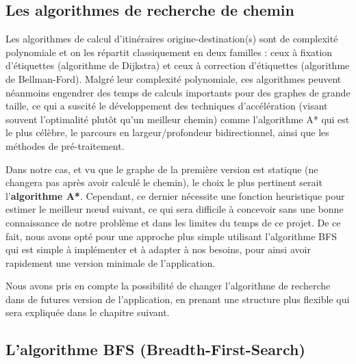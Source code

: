 \subsection{Les algorithmes de recherche de chemin}
Les algorithmes de calcul d'itinéraires origine-destination(s) sont de complexité polynomiale et on les répartit classiquement en deux familles : ceux à fixation d'étiquettes (algorithme de Dijkstra) et ceux à correction d'étiquettes (algorithme de Bellman-Ford).
Malgré leur complexité polynomiale, ces algorithmes peuvent néanmoins engendrer des temps de calculs importants pour des graphes de grande taille, ce qui a suscité le développement des techniques d'accélération (visant souvent l'optimalité plutôt qu'un meilleur chemin) comme l'algorithme A* qui est le plus célèbre, le parcours en largeur/profondeur bidirectionnel, ainsi que les méthodes de pré-traitement.
\newline

Dans notre cas, et vu que le graphe de la première version est statique (ne changera pas après avoir calculé le chemin), le choix le plus pertinent serait l'\textbf{algorithme A*}.
Cependant, ce dernier nécessite une fonction heuristique pour estimer le meilleur nœud suivant, ce qui sera difficile à concevoir sans une bonne connaissance de notre problème et dans les limites du temps de ce projet.
De ce fait, nous avons opté pour une approche plus simple utilisant l'algorithme BFS qui est simple à implémenter et à adapter à nos besoins, pour ainsi avoir rapidement une version minimale de l'application.

Nous avons pris en compte la possibilité de changer l'algorithme de recherche dans de futures version de l'application, en prenant une structure plus flexible qui sera expliquée dans le chapitre suivant.

\subsection{L'algorithme BFS (Breadth-First-Search)}


